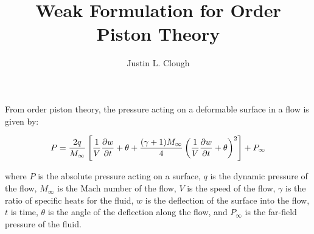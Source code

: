\documentclass[a4paper, 12pt]{article}
\author{Justin L. Clough}
\title{Weak Formulation for \nth{2} Order Piston Theory}
\begin{document}
\maketitle

From  order piston theory, the pressure acting
on a deformable surface in a flow is 
given by:

\begin{equation}
P = \frac{2q}{M_\infty} 
  \left[
    \frac{1}{V} \pdv{w}{t} + \theta 
    + \frac{ (\gamma+1) M_\infty}{4} 
      \left(
        \frac{1}{V} \pdv{w}{t} + \theta
      \right)^2
  \right]
  + P_\infty
\end{equation}

\noindent
where 
$P$ is the absolute pressure acting on a surface,
$q$ is the dynamic pressure of the flow, 
$M_\infty$ is the Mach number of the flow,
$V$ is the speed of the flow,
$\gamma$ is the ratio of specific heats for the fluid,
$w$ is the deflection of the surface into the flow,
$t$ is time, 
$\theta$ is the angle of the deflection along the flow,
and
$P_\infty$ is the far-field pressure of the fluid.
\end{document}
